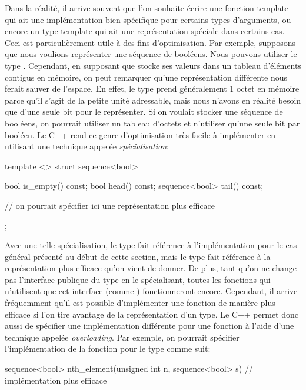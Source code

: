 Dans la réalité, il arrive souvent que l'on souhaite écrire une fonction
template qui ait une implémentation bien spécifique pour certains types
d'arguments, ou encore un type template qui ait une représentation spéciale
dans certains cas. Ceci est particulièrement utile à des fins d'optimisation.
Par exemple, supposons que nous voulions représenter une séquence de booléens.
Nous pouvons utiliser le type . Cependant, en supposant
que  stocke ses valeurs dans un tableau d'éléments contigus en
mémoire, on peut remarquer qu'une représentation différente nous ferait sauver
de l'espace. En effet, le type  prend généralement 1 octet en mémoire
parce qu'il s'agit de la petite unité adressable, mais nous n'avons en réalité
besoin que d'une seule bit pour le représenter. Si on voulait stocker une
séquence de booléens, on pourrait utiliser un tableau d'octets et n'utiliser
qu'une seule bit par booléen. Le C++ rend ce genre d'optimisation très facile
à implémenter en utilisant une technique appelée \textit{spécialisation}:
\begin{cpp}
    template <>
    struct sequence<bool> {
        bool is_empty() const;
        bool head() const;
        sequence<bool> tail() const;

        // on pourrait spécifier ici une représentation plus efficace
    };
\end{cpp}

Avec une telle spécialisation, le type  fait référence à
l'implémentation pour le cas général présenté au début de cette section,
mais le type  fait référence à la représentation plus
efficace qu'on vient de donner. De plus, tant qu'on ne change pas l'interface
publique du type  en le spécialisant, toutes les fonctions
qui n'utilisent que cet interface (comme ) fonctionneront
encore. Cependant, il arrive fréquemment qu'il est possible d'implémenter une
fonction de manière plus efficace si l'on tire avantage de la représentation
d'un type. Le C++ permet donc aussi de spécifier une implémentation différente
pour une fonction à l'aide d'une technique appelée \textit{overloading}. Par
exemple, on pourrait spécifier l'implémentation de la fonction
 pour le type  comme suit:
\begin{cpp}
    sequence<bool> nth_element(unsigned int n, sequence<bool> s) {
        // implémentation plus efficace
    }
\end{cpp}

